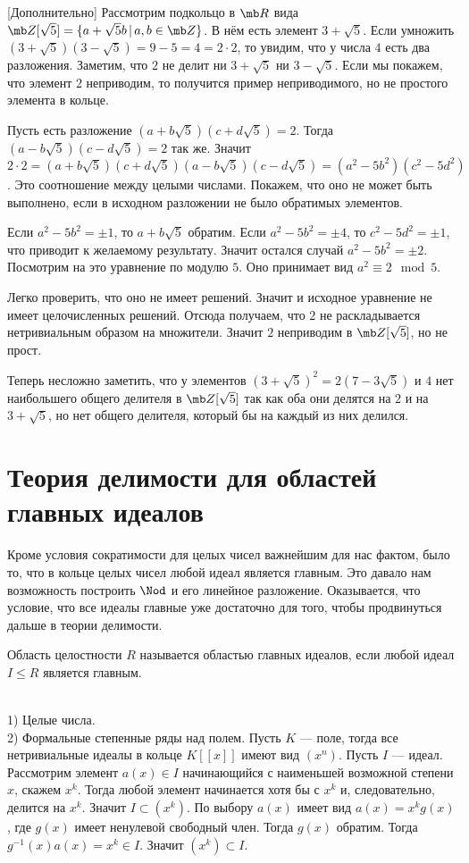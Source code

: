 \rm[Дополнительно] Рассмотрим подкольцо в $\mb R$ вида  $\mb Z[\sqrt{5}]=\{a+\sqrt{5}b\,|\, a,b\in \mb Z\}$. В нём есть элемент $3+\sqrt{5}$. Если умножить $(3+\sqrt{5})(3-\sqrt{5})=9-5=4 =2\cdot 2$, то увидим, что у числа $4$ есть два разложения. Заметим, что $2$ не делит ни $3+\sqrt{5}$ ни $3-\sqrt{5}$. Если мы покажем, что элемент $2$ неприводим, то получится пример неприводимого, но не простого элемента в кольце.

Пусть есть разложение $(a+b\sqrt{5})(c+d\sqrt{5})=2$. Тогда $(a-b\sqrt{5})(c-d\sqrt{5})=2$ так же. Значит
$2\cdot 2= (a+b\sqrt{5})(c+d\sqrt{5})(a-b\sqrt{5})(c-d\sqrt{5})=(a^2-5b^2)(c^2-5d^2)$. Это соотношение между целыми числами. Покажем, что оно не может быть выполнено, если в исходном разложении не было обратимых элементов.

Если $a^2-5b^2=\pm 1$, то $a+b\sqrt{5}$ обратим. Если $a^2-5b^2=\pm 4$, то $c^2-5d^2=\pm 1$, что приводит к желаемому результату. Значит остался случай $a^2-5b^2=\pm 2$. Посмотрим на это уравнение по модулю $5$. Оно принимает вид $a^2\equiv 2 \mod 5$. 

Легко проверить, что оно не имеет решений. Значит и исходное уравнение не имеет целочисленных решений.  Отсюда получаем, что $2$ не раскладывается нетривиальным образом на множители. Значит $2$ неприводим в $\mb Z[\sqrt{5}]$, но не прост.

Теперь несложно заметить, что у элементов $(3+\sqrt{5})^2=2(7-3\sqrt{5})$ и $4$ нет наибольшего общего делителя в $\mb Z[\sqrt{5}]$ так как оба они делятся на $2$ и на $3+\sqrt{5}$, но нет общего делителя, который бы на каждый из них делился.
\erm





\section{Теория делимости для областей главных идеалов}

Кроме условия сократимости для целых чисел важнейшим для нас фактом, было то, что в кольце целых чисел любой идеал является главным. Это давало нам возможность построить $\Nod$ и его линейное разложение. Оказывается, что условие, что все идеалы главные уже достаточно для того, чтобы продвинуться дальше в теории делимости.

 Область целостности $R$ называется областью главных идеалов, если любой идеал $I\leq R$ является главным.
\edfn

\exm\\
1) Целые числа.\\
2) Формальные степенные ряды над полем.
\lm Пусть $K$ --- поле, тогда все нетривиальные идеалы в кольце $K[[x]]$ имеют вид $(x^n)$. \elm
\proof
Пусть $I$ --- идеал. Рассмотрим элемент $a(x)\in I$ начинающийся с наименьшей возможной степени $x$, скажем $x^k$. Тогда любой элемент начинается хотя бы с $x^k$ и, следовательно, делится на $x^k$. Значит $I\subset (x^k)$. По выбору $a(x)$ имеет вид $a(x)=x^k g(x)$, где $g(x)$ имеет ненулевой свободный член. Тогда $g(x)$ обратим. Тогда $g^{-1}(x)a(x)=x^k\in I$. Значит $(x^k)\subset I$.
\endproof

